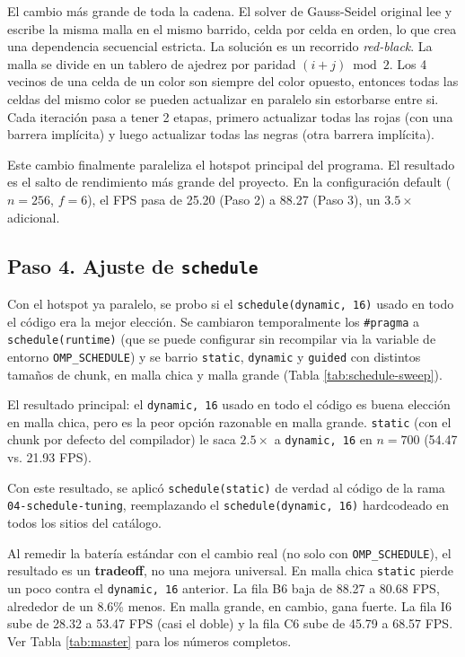 \documentclass[11pt]{article}
\begin{document}
El cambio más grande de toda la cadena. El solver de Gauss-Seidel original
lee y escribe la misma malla en el mismo barrido, celda por celda en
orden, lo que crea una dependencia secuencial estricta. La solución es un
recorrido \emph{red-black}. La malla se divide en un tablero de ajedrez
por paridad $(i+j) \bmod 2$. Los 4 vecinos de una celda de un color son
siempre del color opuesto, entonces todas las celdas del mismo color se
pueden actualizar en paralelo sin estorbarse entre si. Cada iteración pasa a
tener 2 etapas, primero actualizar todas las rojas (con una barrera
implícita) y luego actualizar todas las negras (otra barrera implícita).

Este cambio finalmente paraleliza el hotspot principal del programa. El
resultado es el salto de rendimiento más grande del proyecto. En la
configuración default ($n=256$, $f=6$), el FPS pasa de 25.20 (Paso 2) a
88.27 (Paso 3), un $3.5\times$ adicional.

\subsection{Paso 4. Ajuste de \texttt{schedule}}
\label{sec:schedule}

Con el hotspot ya paralelo, se probo si el \texttt{schedule(dynamic, 16)}
usado en todo el código era la mejor elección. Se cambiaron
temporalmente los \texttt{\#pragma} a \texttt{schedule(runtime)} (que se
puede configurar sin recompilar via la variable de entorno
\texttt{OMP\_SCHEDULE}) y se barrio \texttt{static}, \texttt{dynamic} y
\texttt{guided} con distintos tamaños de chunk, en malla chica y malla
grande (Tabla \ref{tab:schedule-sweep}).

El resultado principal: el \texttt{dynamic, 16} usado en todo el código es
buena elección en malla chica, pero es la peor opción razonable en malla
grande. \texttt{static} (con el chunk por defecto del compilador) le saca
$2.5\times$ a \texttt{dynamic, 16} en $n=700$ (54.47 vs. 21.93 FPS).

Con este resultado, se aplicó \texttt{schedule(static)} de verdad al
código de la rama \texttt{04-\allowbreak schedule-\allowbreak tuning},
reemplazando el \texttt{schedule(dynamic,\allowbreak\ 16)} hardcodeado en
todos los sitios del catálogo.

Al remedir la batería estándar con el cambio real (no solo con
\texttt{OMP\_SCHEDULE}), el resultado es un \textbf{tradeoff}, no una
mejora universal. En malla chica \texttt{static} pierde un poco contra el
\texttt{dynamic, 16} anterior. La fila B6 baja de 88.27 a 80.68 FPS,
alrededor de un 8.6\% menos. En malla grande, en cambio, gana fuerte. La
fila I6 sube de 28.32 a 53.47 FPS (casi el doble) y la fila C6 sube de
45.79 a 68.57 FPS. Ver Tabla \ref{tab:master} para los números completos.
\end{document}

